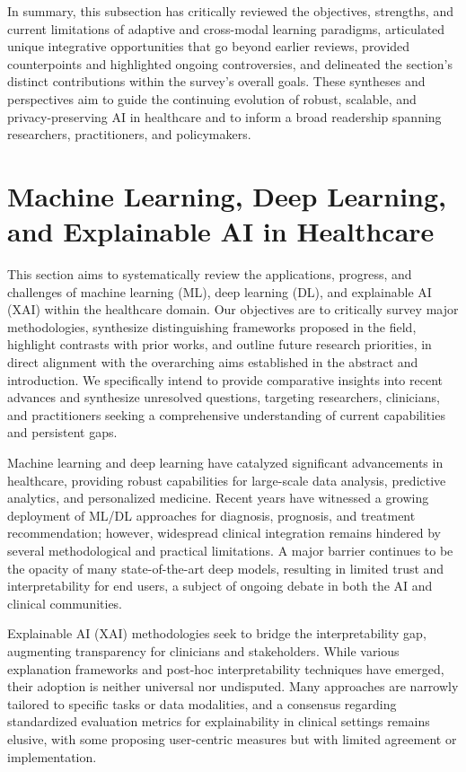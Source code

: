 \documentclass[sigconf]{acmart}
\begin{document}
In summary, this subsection has critically reviewed the objectives, strengths, and current limitations of adaptive and cross-modal learning paradigms, articulated unique integrative opportunities that go beyond earlier reviews, provided counterpoints and highlighted ongoing controversies, and delineated the section's distinct contributions within the survey's overall goals. These syntheses and perspectives aim to guide the continuing evolution of robust, scalable, and privacy-preserving AI in healthcare and to inform a broad readership spanning researchers, practitioners, and policymakers.

\section{Machine Learning, Deep Learning, and Explainable AI in Healthcare}

This section aims to systematically review the applications, progress, and challenges of machine learning (ML), deep learning (DL), and explainable AI (XAI) within the healthcare domain. Our objectives are to critically survey major methodologies, synthesize distinguishing frameworks proposed in the field, highlight contrasts with prior works, and outline future research priorities, in direct alignment with the overarching aims established in the abstract and introduction. We specifically intend to provide comparative insights into recent advances and synthesize unresolved questions, targeting researchers, clinicians, and practitioners seeking a comprehensive understanding of current capabilities and persistent gaps.

Machine learning and deep learning have catalyzed significant advancements in healthcare, providing robust capabilities for large-scale data analysis, predictive analytics, and personalized medicine. Recent years have witnessed a growing deployment of ML/DL approaches for diagnosis, prognosis, and treatment recommendation; however, widespread clinical integration remains hindered by several methodological and practical limitations. A major barrier continues to be the opacity of many state-of-the-art deep models, resulting in limited trust and interpretability for end users, a subject of ongoing debate in both the AI and clinical communities.

Explainable AI (XAI) methodologies seek to bridge the interpretability gap, augmenting transparency for clinicians and stakeholders. While various explanation frameworks and post-hoc interpretability techniques have emerged, their adoption is neither universal nor undisputed. Many approaches are narrowly tailored to specific tasks or data modalities, and a consensus regarding standardized evaluation metrics for explainability in clinical settings remains elusive, with some proposing user-centric measures but with limited agreement or implementation.
\end{document}

